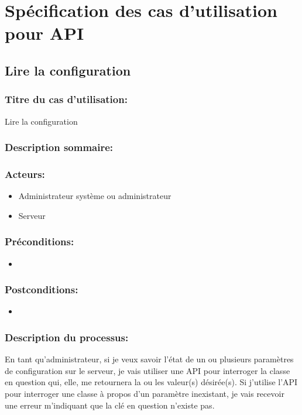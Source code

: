 \documentclass{scrreprt}
\begin{document}
\section{Spécification des cas d'utilisation pour API}
\subsection{Lire la configuration}
\subsubsection{Titre du cas d'utilisation:} Lire la configuration
\subsubsection{Description sommaire:}
\subsubsection{Acteurs:}
\begin{itemize}
	\item Administrateur système ou administrateur
    \item Serveur
\end{itemize}
\subsubsection{Préconditions:}
\begin{itemize}
    \item  
\end{itemize} 
\subsubsection{Postconditions:}
\begin{itemize}
    \item  
\end{itemize} 
\subsubsection{Description du processus:}En tant qu'administrateur, si je veux savoir l'état de un ou plusieurs paramètres de
configuration sur le serveur, je vais utiliser une API pour interroger la
classe en question qui, elle, me retournera la ou les valeur(s) désirée(s).
Si j'utilise l'API pour interroger une classe à propos d'un paramètre
inexistant, je vais recevoir une erreur m'indiquant que la clé en question
n'existe pas.
\end{document}
